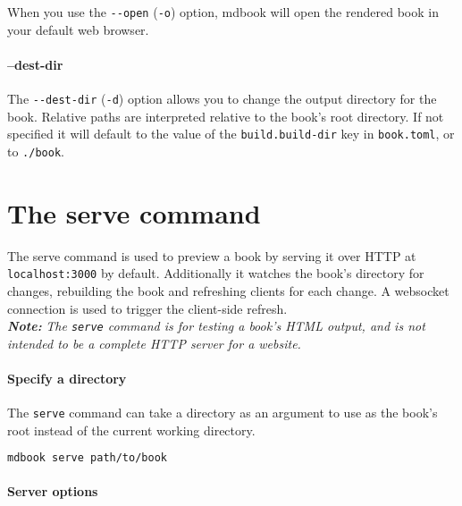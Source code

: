\documentclass{article}
\begin{document}
When you use the \lstinline|--open| (\lstinline|-o|) option, mdbook will open the rendered book in
your default web browser.\\

\paragraph{--dest-dir}
\label{--dest-dir}
\label{dest-dir}

The \lstinline|--dest-dir| (\lstinline|-d|) option allows you to change the output directory for the
book. Relative paths are interpreted relative to the book's root directory. If
not specified it will default to the value of the \lstinline|build.build-dir| key in
\lstinline|book.toml|, or to \lstinline|./book|.\\

\section{The serve command}
\label{The serve command}
\label{the-serve-command}

The serve command is used to preview a book by serving it over HTTP at
\lstinline|localhost:3000| by default. Additionally it watches the book's directory for
changes, rebuilding the book and refreshing clients for each change. A websocket
connection is used to trigger the client-side refresh.\\

\emph{\textbf{Note:}} \emph{The \lstinline|serve| command is for testing a book's HTML output, and is not
intended to be a complete HTTP server for a website.}\\

\paragraph{Specify a directory}
\label{Specify a directory}
\label{specify-a-directory}

The \lstinline|serve| command can take a directory as an argument to use as the book's
root instead of the current working directory.\\
\begin{lstlisting}[language=bash]
mdbook serve path/to/book

\end{lstlisting}

\paragraph{Server options}
\label{Server options}
\label{server-options}
\end{document}
